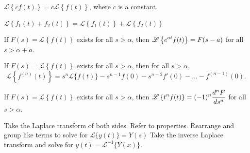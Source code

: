 \begin{enumerate}[label=L.\arabic*]
\ii $\mathscr{L} \left\{ cf(t) \right\} = c  \mathscr{L} \left\{ f(t) \right\}$, where $c$ is a constant. \ms

\ii $\mathscr{L} \left\{ f_1(t) + f_2(t) \right\} = \mathscr{L} \left\{ f_1(t) \right\} + \mathscr{L} \left\{ f_2(t)\right\}$ \ms

\ii If $F(s) = \mathscr{L} \left\{ f(t) \right\}$ exists for all $s > \alpha$, then $\displaystyle \mathscr{L} \left\{ e^{at} f(t) \right\} = F(s-a)$ for all $s>\alpha + a$.  \ms

\ii If $F(s) =\mathscr{L} \left\{ f(t) \right\}$ exists for all $s > \alpha$, then for all $s>\alpha$,
\[ \mathscr{L} \left\{ f^{(n)}(t) \right\} = s^n  \mathscr{L}  \{ f(t) \}-s^{n-1} f(0)- s^{n-2} f'(0) - \ldots - f^{(n-1)}(0).\] \ms


\ii If $F(s) =\mathscr{L} \left\{ f(t) \right\}$ exists for all $s > \alpha$, then $\displaystyle \mathscr{L} \left\{ t^n f(t) \right\} = (-1)^n \frac{d^nF}{ds^n}$ for all $s > \alpha$.
\ee


\clearpage



\bb[label=Step \arabic*]
\ii Take the Laplace transform of both sides. Refer to properties.
\ii Rearrange and group like terms to solve for $\mathcal{L}\{y(t)\}=Y(s)$
\ii Take the inverse Laplace transform and solve for $y(t) = \mathcal{L}^{-1}\{Y(x) \}$.
\ee


\end{enumerate}
